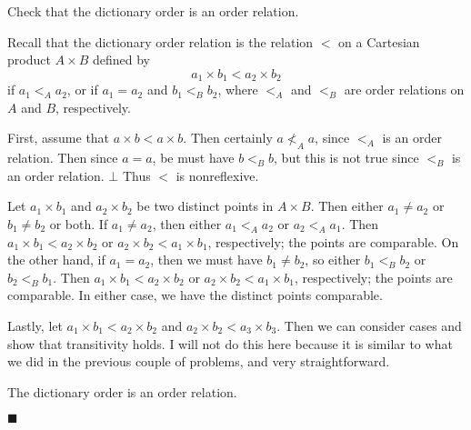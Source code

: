 \documentclass[12pt]{article}
\renewcommand{\qed}{\hfill$\blacksquare$}
\renewenvironment{proof}{\begin{addmargin}[1em]{0em}\begin{newproof}}{\end{newproof}\end{addmargin}\qed}
\newenvironment{problem}[2][Exercise]{\begin{trivlist}
\item[\hskip \labelsep {\bfseries #1}\hskip \labelsep {\bfseries #2.}]}{\end{trivlist}}
\begin{document}
\begin{problem}{1.3.9}
Check that the dictionary order is an order relation.
\end{problem}
\begin{proof}
Recall that the dictionary order relation is the relation $<$ on a Cartesian product $A\times B$ defined by \[ a_1 \times b_1 < a_2 \times b_2 \] if $a_1 <_A a_2$, or if $a_1 = a_2$ and $b_1 <_B b_2$, where $<_A$ and $<_B$ are order relations on $A$ and $B$, respectively.

First, assume that $a\times b < a\times b$. Then certainly $a \not<_A a$, since $<_A$ is an order relation. Then since $a=a$, be must have $b <_B b$, but this is not true since $<_B$ is an order relation. $\bot$ Thus $<$ is nonreflexive.

Let $a_1 \times b_1$ and $a_2 \times b_2$ be two distinct points in $A\times B$. Then either $a_1 \neq a_2$ or $b_1 \neq b_2$ or both. If $a_1 \neq a_2$, then either $a_1 <_A a_2$ or $a_2 <_A a_1$. Then $ a_1\times b_1 < a_2 \times b_2 $ or $a_2 \times b_2 < a_1 \times b_1$, respectively; the points are comparable. On the other hand, if $a_1 = a_2$, then we must have $b_1 \neq b_2$, so either $b_1 <_B b_2$ or $b_2 <_B b_1$. Then $ a_1\times b_1 < a_2 \times b_2 $ or $a_2 \times b_2 < a_1 \times b_1$, respectively; the points are comparable. In either case, we have the distinct points comparable.

Lastly, let $a_1 \times b_1 < a_2 \times b_2$ and $a_2 \times b_2 < a_3 \times b_3$. Then we can consider cases and show that transitivity holds. I will not do this here because it is similar to what we did in the previous couple of problems, and very straightforward.

The dictionary order is an order relation.
\end{proof}
\end{document}
